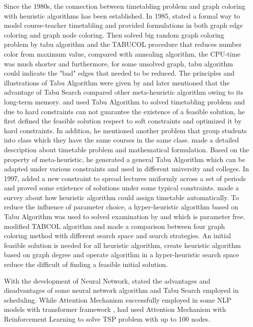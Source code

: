 \documentclass{article}
\begin{document}
Since the 1980s, the connection between timetabling problem and graph coloring with heuristic algorithms has been established. In 1985, \citet{(werra1985)introduction} stated a formal way to model course-teacher timetabling and provided formulations in both graph edge coloring and graph node coloring. Then \cite{(hertz1987)using} solved big random graph coloring problem by tabu algorithm and the TABUCOL procedure that reduces number color from maximum value, compared with annealing algorithm, the CPU-time was much shorter and furthermore, for some unsolved graph, tabu algorithm could indicate the "bad" edges that needed to be reduced. The principles and illustrations of Tabu Algorithm were given by \cite{(werra1989)tabu} and later \cite{(glover1990)tabu} mentioned that the advantage of Tabu Search compared other meta-heuristic algorithm owing to its long-term memory. \cite{(hertz1991)tabu} and \cite{(tuga2007)hybrid} used Tabu Algorithm to solved timetabling problem and due to hard constraints can not guarantee the existence of a feasible solution, he first defined the feasible solution respect to soft constraints and optimized it by hard constraints. In addition, he mentioned another problem that group students into class which they have the same courses in the same class. \cite{(costa1994)tabu} made a detailed description about timetable problem and mathematical formulation. Based on the property of meta-heuristic, he generated a general Tabu Algorithm which can be adapted under various constraints and used in different university and colleges. In 1997, \cite{(werra1997)combinatorics} added a new constraint to spread lectures uniformly across a set of periods and proved some existence of solutions under some typical constraints. \cite{(schaerf1999)survey} made a survey about how heuristic algorithm could assign timetable automatically. To reduce the influence of parameter choice, a hyper-heuristic algorithm based on Tabu Algorithm was used to solved examination by \cite{(hussin2005)tabu} and \cite{(kendall2005)investigation} which is parameter free. \cite{(galinier2006)survey} modified TABCOL algorithm and made a comparison between four graph coloring method with different search space and search strategies. An initial feasible solution is needed for all heuristic algorithm, \cite{(burke2007)graphbased} create heuristic algorithm based on graph degree and operate algorithm in a hyper-heuristic search space reduce the difficult of finding a feasible initial solution.

With the development of Neural Network, \cite{(fazelzarandi2020)state} stated the advantages and disadvantages of some neural network algorithm and Tabu Search employed in scheduling. While Attention Mechanism successfully employed in some NLP models with transformer framework \citep{(ashishvaswani2017)attention,(devlin2019)bert}, \cite{(kool2019)attention} had used Attention Mechanism with Reinforcement Learning to solve TSP problem with up to 100 nodes.
\end{document}
